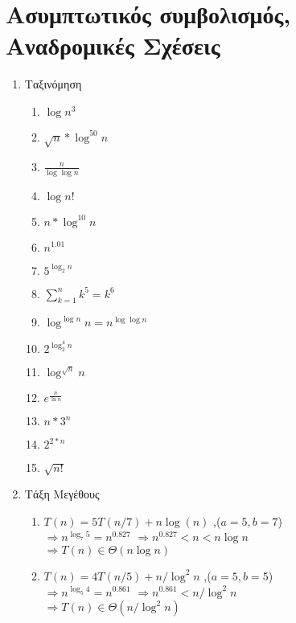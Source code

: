 \documentclass[a4paper,10pt]{article} \usepackage{anysize}
\newcommand{\tab}{\hspace*{3em}}
\begin{document}
\renewcommand{\labelenumi}{\roman{enumi})}
\renewcommand{\labelenumii}{(\arabic{enumii})}



\section{Ασυμπτωτικός συμβολισμός, Αναδρομικές
Σχέσεις} \setcounter{section}{1}
\begin{enumerate}

\item Ταξινόμηση
\begin{enumerate}
\item $\log {n^3}$
\item $\sqrt{n}*\log^{50}{n} $
\item $\frac{n}{\log{\log{n}} } $
\item $\log{n!} $
\item $n*\log^{10}{n} $
\item $n^{1.01} $
\item $5^{\log_{2}{n}} $
\item $\sum_{k=1}^n{k^5} = {k^6}$
\item $\log^{\log{n}}{n} = n^{\log{\log{n}} } $
\item $2^{\log_2^4{n}} $
\item $\log^{\sqrt{n}}{n} $
\item $e^{\frac{n}{\ln{n}} } $
\item $n*3^n $
\item $2^{2*n} $
\item $\sqrt{n!} $
\end{enumerate}

\item Τάξη Μεγέθους
\begin{enumerate}
\item $T(n)=5T(n/7)+n\log(n)$ ,\tab ($a=5 , b=7$) \\
$\Rightarrow n^{\log _7 {5}} = n^{0.827}$
$\Rightarrow n^{0.827} < n < n\log{n}$\\
$\Rightarrow T(n) \in \Theta(n\log{n})$

\item $T(n) = 4T(n/5)+n/\log^2{n}$ ,\tab ($a=5 , b=5$)\\
$\Rightarrow n^{\log_5 {4}} = n^{0.861}$
$\Rightarrow n^{0.861} < n/\log^2{n}$\\
$\Rightarrow T(n) \in \Theta(n/\log^2{n})$


\end{enumerate}
\end{enumerate}
\end{document}
